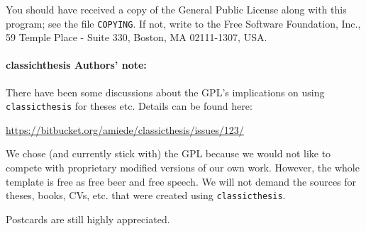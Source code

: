 You should have received a copy of the  General
Public License
along with this program; see the file \texttt{COPYING}.  If not,
write to
the Free Software Foundation, Inc., 59 Temple Place - Suite 330,
Boston, MA 02111-1307, USA.

\paragraph{classichthesis Authors' note:} There have been some discussions about the GPL's implications on using \texttt{classicthesis} for theses etc. Details can be found here:
\begin{center}
    \url{https://bitbucket.org/amiede/classicthesis/issues/123/}
\end{center}

We chose (and currently stick with) the GPL because we would not like to compete with proprietary modified versions of our own work. However, the whole template is free as free beer and free speech. We will not demand the sources for theses, books, CVs, etc. that were created using \texttt{classicthesis}.

Postcards are still highly appreciated.





